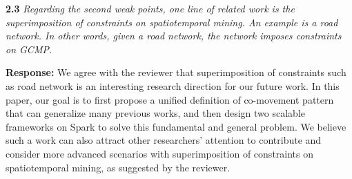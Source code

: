 \documentclass{vldb}
\begin{document}
{%
%
%
%
}


\textbf{2.3} \emph{Regarding the second weak points, one line of related work is the superimposition
of constraints on spatiotemporal mining. An example is a road network. In other words, given a road network, the network imposes constraints on GCMP.}

\textbf{Response:} We agree with the reviewer that superimposition of constraints such as road network is an interesting research direction for our future work. In this paper, our goal is to first propose a unified definition of co-movement pattern that can generalize many previous works, and then design two scalable frameworks on Spark to solve this fundamental and general problem. We believe such a work can also attract other researchers' attention to contribute and consider more advanced scenarios with superimposition
of constraints on spatiotemporal mining, as suggested by the reviewer.
\end{document}
